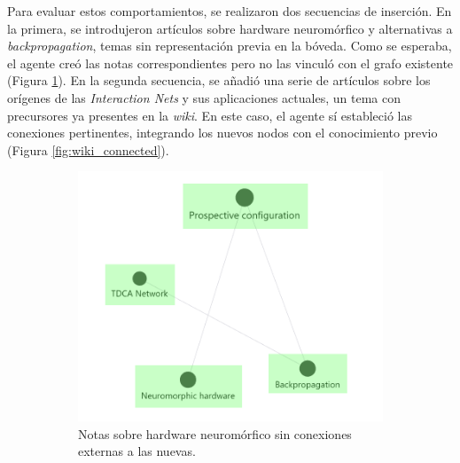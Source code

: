 Para evaluar estos comportamientos, se realizaron dos secuencias de inserción. En la primera, se introdujeron artículos sobre hardware neuromórfico y alternativas a \textit{backpropagation}, temas sin representación previa en la bóveda. Como se esperaba, el agente creó las notas correspondientes pero no las vinculó con el grafo existente (Figura \ref{fig:wiki_isolated}). En la segunda secuencia, se añadió una serie de artículos sobre los orígenes de las \textit{Interaction Nets} y sus aplicaciones actuales, un tema con precursores ya presentes en la \textit{wiki}. En este caso, el agente sí estableció las conexiones pertinentes, integrando los nuevos nodos con el conocimiento previo (Figura \ref{fig:wiki_connected}).

\begin{figure}[h!]
    \centering
    \begin{subfigure}[b]{0.48\textwidth}
        \centering
        \includegraphics[width=\textwidth]{figures/neuromPart.png}
        \caption{Notas sobre hardware neuromórfico sin conexiones externas a las nuevas.}
        \label{fig:wiki_isolated}
    \end{subfigure}
    \hfill
    \begin{subfigure}[b]{0.5\textwidth}
        \centering

\end{subfigure}
\end{figure}
